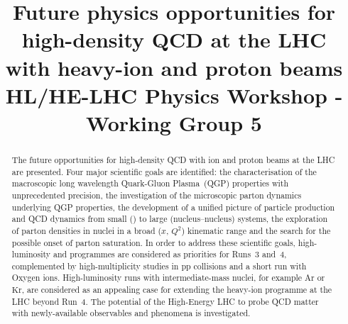 \documentclass[11pt,twoside,a4paper]{cernrep}
\def\bibfiles{\main/bib/chapter,\main/introduction/bib/section,\main/schedule/bib/section,\main/hf/bib/section,\main/quarkonia/bib/section,\main/thermalradiation/bib/section,\main/flow/bib/section,\main/smallsystems/bib/section,\main/lightflavour/bib/section,\main/jets/bib/section,\main/smallx/bib/section,\main/beyond/bib/section,\main/helhc/bib/section,\main/accelerator/bib/section,\main/smallAexec/bib/section}
\providecommand{\biblio}{\clearpage}  %
\begin{document}
\newcommand{\main}{.}



\title{Future physics opportunities for high-density QCD at the LHC\\ with heavy-ion and proton beams \\
\vspace{5mm}
\small{HL/HE-LHC Physics Workshop - Working Group 5}}


\maketitle

\begin{abstract}
 The future opportunities for high-density QCD with ion and proton beams at the LHC are presented. Four major scientific goals are identified: the characterisation of the macroscopic long wavelength Quark-Gluon Plasma~(QGP) properties with unprecedented precision, the investigation of the microscopic parton dynamics underlying QGP properties, the development of a unified picture of particle production and QCD dynamics from small (\pp) to large (nucleus--nucleus) systems, the exploration of parton densities in nuclei in a broad ($x$, $Q^2$) kinematic range and the search for the possible onset of parton saturation. In order to address these scientific goals, high-luminosity \PbPb and \pPb programmes are considered as priorities for Runs~3 and~4, complemented by high-multiplicity studies in pp collisions and a  short run with Oxygen ions. High-luminosity runs with intermediate-mass nuclei, for example $\mathrm{Ar}$ or $\mathrm{Kr}$, are considered as an appealing case for extending the heavy-ion programme at the LHC beyond Run~4. The potential of the High-Energy LHC to probe QCD matter with newly-available observables and phenomena is investigated.
\end{abstract}

\setcounter{tocdepth}{2}
{ 
\baselineskip=12pt
\tableofcontents
}
\clearpage


\clearpage

\clearpage

\clearpage

\clearpage

\clearpage

\clearpage

\clearpage

\clearpage

\clearpage

\clearpage

\clearpage

\clearpage

\clearpage



%
%
\footnotesize
\biblio
\end{document}
